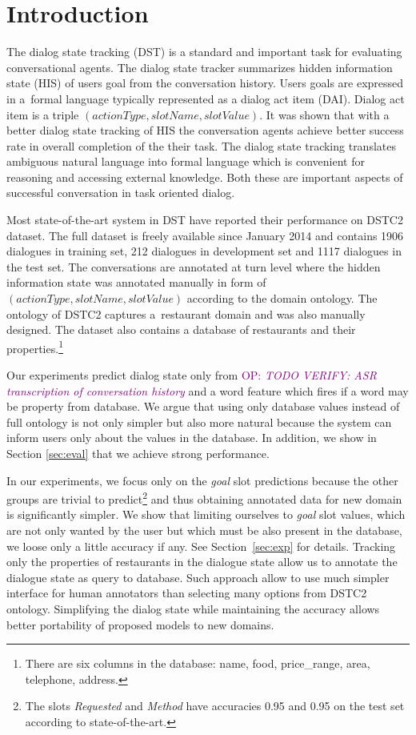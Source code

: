 \documentclass{itatnew}
\def\OP#1{\textcolor{purple}{OP: \textit{#1}}}
\begin{document}
\section{Introduction}
%
The dialog state tracking (DST) is a standard and important task for evaluating conversational agents\cite{williams2013dialog, henderson2014second, henderson2014third}.
The dialog state tracker summarizes hidden information state (HIS)\cite{young2010hidden} of users goal from the conversation history.
Users goals are expressed in a~formal language typically represented as a dialog act item (DAI). Dialog act item is a triple $(actionType, slotName, slotValue)$.
It was shown that with a better dialog state tracking of HIS the conversation agents achieve better success rate in overall completion of the their task\cite{jurvcivcek2012reinforcement}.
The dialog state tracking translates ambiguous natural language into formal language which is convenient for reasoning and accessing external knowledge. Both these are important aspects of successful conversation in task oriented dialog.

Most state-of-the-art system in DST have reported their performance on DSTC2 dataset\cite{henderson2014second}. 
The full dataset is freely available since January 2014 and contains 1906 dialogues in training set, 212 dialogues in development set and 1117 dialogues in the test set.
The conversations are annotated at turn level where the hidden information state was annotated manually in form of $(actionType, slotName, slotValue)$
according to the
domain ontology.
The ontology of DSTC2 captures a~restaurant domain and was also manually designed.
The dataset also contains a database of restaurants and their properties.\footnote{There are six columns in the database: name, food, price\_range, area, telephone, address.}

Our experiments predict dialog state only from \OP{TODO VERIFY: ASR transcription of conversation history } and a word feature which fires if a word may be property from database.
We argue that using only database values instead of full ontology is not only simpler but also more natural because the system can inform users only about the values in the database.
In addition, we show in Section \ref{sec:eval} that we achieve strong performance.

In our experiments, we focus only on the {\it goal} slot predictions because the other groups are trivial to predict\footnote{The slots {\it Requested} and {\it Method} have accuracies 0.95 and 0.95 on the test set according to state-of-the-art\cite{williams2014web}.} and thus obtaining annotated data for new domain is significantly simpler.
We show that limiting ourselves to {\it goal} slot values, which are not only wanted by the user but which must be also present in the database, we loose only a little accuracy if any.
See Section~\ref{sec:exp} for details.
Tracking only the properties of restaurants in the dialogue state allow us to annotate the dialogue state as query to database. Such approach allow to use much simpler interface for human annotators than selecting many options from DSTC2 ontology.
Simplifying the dialog state while maintaining the accuracy allows better portability of proposed models to new domains.
\end{document}
